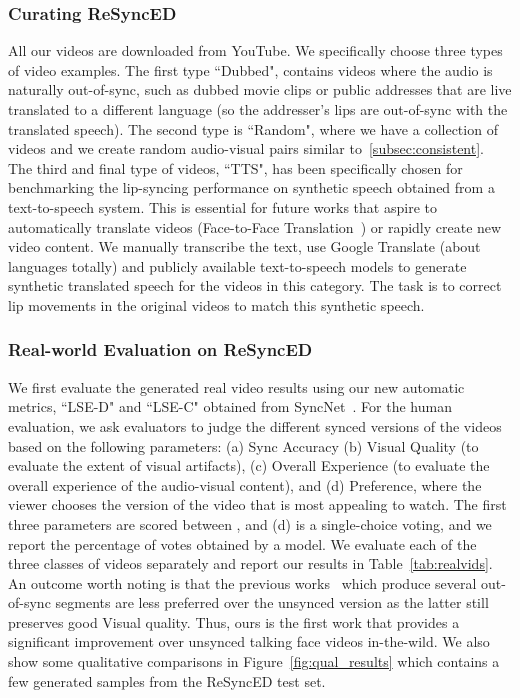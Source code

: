 \documentclass[sigconf]{acmart}
\begin{document}
\subsubsection{Curating ReSyncED} All our videos are downloaded from YouTube. We specifically choose three types of video examples. The first type ``Dubbed", contains videos where the audio is naturally out-of-sync, such as dubbed movie clips or public addresses that are live translated to a different language (so the addresser's lips are out-of-sync with the translated speech). The second type is ``Random", where we have a collection of videos and we create random audio-visual pairs similar to~\ref{subsec:consistent}. The third and final type of videos, ``TTS", has been specifically chosen for benchmarking the lip-syncing performance on synthetic speech obtained from a text-to-speech system. This is essential for future works that aspire to automatically translate videos (Face-to-Face Translation~\cite{kr2019towards}) or rapidly create new video content. We manually transcribe the text, use Google Translate (about  languages totally) and publicly available text-to-speech models to generate synthetic translated speech for the videos in this category. The task is to correct lip movements in the original videos to match this synthetic speech.

\subsubsection{Real-world Evaluation on ReSyncED}
We first evaluate the generated real video results using our new automatic metrics, ``LSE-D" and ``LSE-C" obtained from SyncNet~\cite{Chung16a}. For the human evaluation, we ask  evaluators to judge the different synced versions of the videos based on the following parameters: (a) Sync Accuracy (b) Visual Quality (to evaluate the extent of visual artifacts), (c) Overall Experience (to evaluate the  overall experience of the audio-visual content), and (d) Preference, where the viewer chooses the version of the video that is most appealing to watch. The first three parameters are scored between , and (d) is a single-choice voting, and we report the percentage of votes obtained by a model. We evaluate each of the three classes of videos separately and report our results in Table~\ref{tab:realvids}. An outcome worth noting is that the previous works~\cite{kr2019towards,jamaludin2019you} which produce several out-of-sync segments are less preferred over the unsynced version as the latter still preserves good Visual quality. Thus, ours is the first work that provides a significant improvement over unsynced talking face videos in-the-wild. We also show some qualitative comparisons in Figure~\ref{fig:qual_results} which contains a few generated samples from the ReSyncED test set.
\end{document}
